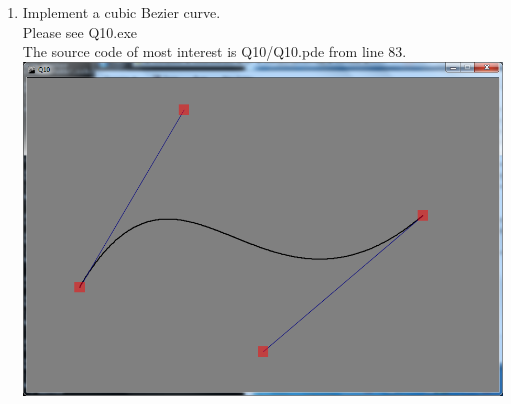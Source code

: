 \documentclass{article}
\begin{document}
\begin{enumerate}
\item Implement a cubic Bezier curve. \\
Please see Q10.exe \\
The source code of most interest is Q10/Q10.pde from line 83.
\\
\includegraphics[scale=0.5]{Bezier}
\\

\end{enumerate}
\end{document}
